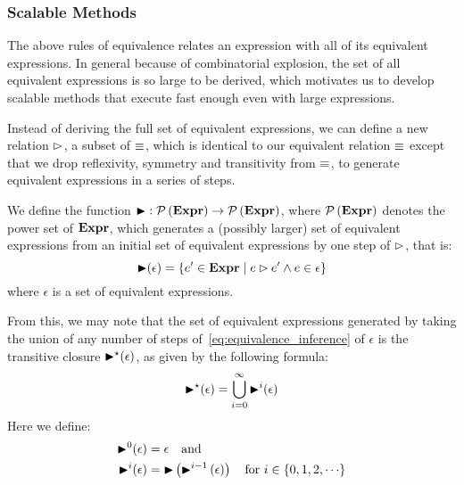 \subsubsection{Scalable Methods}

The above rules of equivalence relates an expression with all of its equivalent
expressions.  In general because of combinatorial explosion, the set of all
equivalent expressions is so large to be derived, which motivates us to develop
scalable methods that execute fast enough even with large expressions.

Instead of deriving the full set of equivalent expressions, we can define a
new relation $\mathbin{\rhd}$, a subset of $\equiv$, which is identical to our
equivalent relation $\equiv$ except that we drop reflexivity, symmetry and
transitivity from $\equiv$, to generate equivalent expressions in a series of
steps.

We define the function $\operatorname{\blacktriangleright}: \mathcal{P}\left({\mathbf{Expr}}\right)\to\mathcal{P}\left({\mathbf{Expr}}\right)$,
where $\mathcal{P}\left({\mathbf{Expr}}\right)$ denotes the power set of $\mathbf{Expr}$, which
generates a (possibly larger) set of equivalent expressions from an initial set
of equivalent expressions by one step of $\mathbin{\rhd}$, that is:
\begin{equation}
    \operatorname{\blacktriangleright}(\epsilon) = \left\{
        e^\prime\in\mathbf{Expr} \mid
        e \mathbin{\rhd} e^\prime \wedge e\in\epsilon\right\}
\end{equation}
where $\epsilon$ is a set of equivalent expressions.

From this, we may note that the set of equivalent expressions generated by
taking the union of any number of steps of~\eqref{eq:equivalence_inference} of
$\epsilon$ is the transitive closure $\operatorname{\blacktriangleright}^\star(\epsilon)$, as given by the
following formula:
\begin{equation}
    \operatorname{\blacktriangleright}^\star(\epsilon) = \bigcup_{i = 0}^\infty \operatorname{\blacktriangleright}^i(\epsilon)
    \label{eq:transitive_closure}
\end{equation}
Here we define:
\begin{equation}
    \begin{aligned}
        \operatorname{\blacktriangleright}^0(\epsilon) &= \epsilon \quad \text{and~} \\
        \operatorname{\blacktriangleright}^i(\epsilon) &= \operatorname{\blacktriangleright}\left(
            \operatorname{\blacktriangleright}^{i - 1}\left(\epsilon\right)
        \right) \quad \text{for~} i \in \{ 0, 1, 2, \cdots \}
    \end{aligned}
\end{equation}

